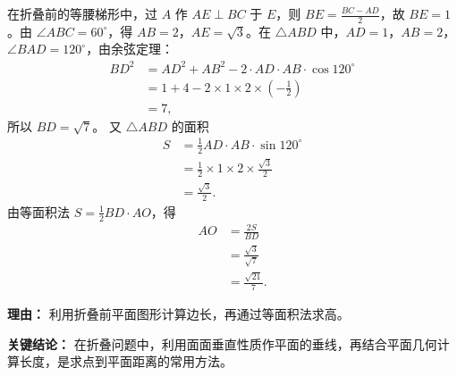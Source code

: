 \begin{examplebox}
\begin{description}[style=nextline, leftmargin=2.8em, labelsep=0.5em, itemsep=0.45em]
		\item[\textbf{第三步（求 $AO$ 长度）：}] 在折叠前的等腰梯形中，过 $A$ 作 $AE\perp BC$ 于 $E$，则 $BE=\frac{BC-AD}{2}$，故 $BE=1$。由 $\angle ABC=60^\circ$，得 $AB=2$，$AE=\sqrt{3}$。在 $\triangle ABD$ 中，$AD=1$，$AB=2$，$\angle BAD=120^\circ$，由余弦定理：
			\[
				\begin{aligned}
					BD^2 &= AD^2+AB^2-2\cdot AD\cdot AB\cdot\cos120^\circ\\
					&= 1+4-2\times1\times2\times\left(-\frac12\right)\\
					&= 7,
			\end{aligned}
			\]
			所以 $BD=\sqrt{7}$。
			又 $\triangle ABD$ 的面积
			\[
				\begin{aligned}
					S &= \frac12 AD\cdot AB\cdot\sin120^\circ\\
					&= \frac12\times1\times2\times\frac{\sqrt3}{2}\\
					&= \frac{\sqrt3}{2}.
			\end{aligned}
			\]
			由等面积法 $S=\frac12 BD\cdot AO$，得
			\[
				\begin{aligned}
					AO &= \frac{2S}{BD}\\
					&= \frac{\sqrt3}{\sqrt7}\\
					&= \frac{\sqrt{21}}{7}.
			\end{aligned}
			\]
			\par\textbf{理由：} 利用折叠前平面图形计算边长，再通过等面积法求高。
	\end{description}

	\textbf{\textcolor{CExample}{关键结论：}}
	在折叠问题中，利用面面垂直性质作平面的垂线，再结合平面几何计算长度，是求点到平面距离的常用方法。
\end{examplebox}
